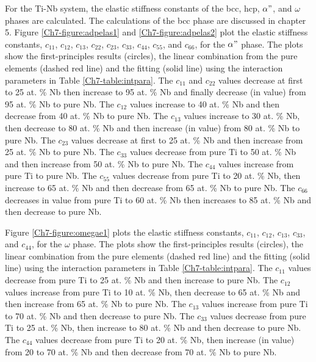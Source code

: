 For the Ti-Nb system, the elastic stiffness constants of the bcc, hcp, $\alpha"$, and $\omega$ phases are calculated. The calculations of the bcc phase are discussed in chapter 5. Figure \ref{Ch7-figure:adpelas1} and \ref{Ch7-figure:adpelas2} plot the elastic stiffness constants, $c_{11}$, $c_{12}$, $c_{13}$, $c_{22}$, $c_{23}$, $c_{33}$, $c_{44}$, $c_{55}$, and $c_{66}$, for the $\alpha"$ phase. The plots show the first-principles results (circles), the linear combination from the pure elements (dashed red line) and the fitting (solid line) using the interaction parameters in Table \ref{Ch7-table:intpara}. The $c_{11}$ and $c_{22}$ values decrease at first to 25 at. \% Nb then increase to 95 at. \% Nb and finally decrease (in value) from 95 at. \% Nb to pure Nb. The $c_{12}$ values increase to 40 at. \% Nb and then decrease from 40 at. \% Nb to pure Nb. The $c_{13}$ values increase to 30 at. \% Nb, then decrease to 80 at. \% Nb and then increase (in value) from 80 at. \% Nb to pure Nb. The $c_{23}$ values decrease at first to 25 at. \% Nb and then increase from 25 at. \% Nb to pure Nb. The $c_{33}$ values decrease from pure Ti to 50 at. \% Nb and then increase from 50 at. \% Nb to pure Nb. The $c_{44}$ values increase from pure Ti to pure Nb. The $c_{55}$ values decrease from pure Ti to 20 at. \% Nb, then increase to 65 at. \% Nb and then decrease from 65 at. \% Nb to pure Nb. The $c_{66}$ decreases in value from pure Ti to 60 at. \% Nb then increases to 85 at. \% Nb and then decrease to pure Nb.

Figure \ref{Ch7-figure:omegae1} plots the elastic stiffness constants, $c_{11}$, $c_{12}$, $c_{13}$, $c_{33}$, and $c_{44}$, for the $\omega$ phase. The plots show the first-principles results (circles), the linear combination from the pure elements (dashed red line) and the fitting (solid line) using the interaction parameters in Table \ref{Ch7-table:intpara}. The $c_{11}$ values decrease from pure Ti to 25 at. \% Nb and then increase to pure Nb. The $c_{12}$ values increase from pure Ti to 10 at. \% Nb, then decrease to 65 at. \% Nb and then increase from 65 at. \% Nb to pure Nb. The $c_{13}$ values increase from pure Ti to 70 at. \% Nb and then decrease to pure Nb. The $c_{33}$ values decrease from pure Ti to 25 at. \% Nb, then increase to 80 at. \% Nb and then decrease to pure Nb. The $c_{44}$ values decrease from pure Ti to 20 at. \% Nb, then increase (in value) from 20 to 70 at. \% Nb and then decrease from 70 at. \% Nb to pure Nb.

